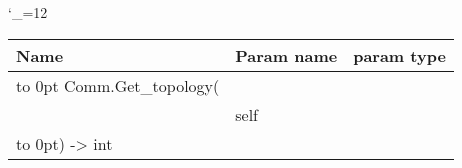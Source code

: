 \begingroup \catcode`\_=12 \tt
\begin{tabular}{lll}
\toprule
\textrm{Name}&\textrm{Param name}&\textrm{param type}\\
\midrule
\hbox to 0pt {Comm.Get_topology(\hss}\\
& self\\
\hbox to 0pt{) -> int\hss}\\
\bottomrule
\end{tabular}
\endgroup
